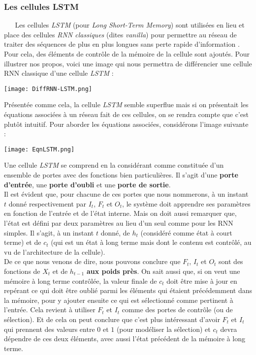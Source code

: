 \subsubsection{Les cellules LSTM}
$ _{} $ $ _{} $ $ _{} $ $ _{} $ $ _{} $Les cellules \textit{LSTM} (pour \textit{Long Short-Term Memory}) sont utilisées en lieu et place des cellules \textit{RNN classiques} (dites \textit{vanilla}) pour permettre au réseau de traiter des séquences de plus en plus longues sans perte rapide d'information \cite{geron2020deep}. Pour cela, des éléments de contrôle de la mémoire de la cellule sont ajoutés. Pour illustrer nos propos, voici une image qui nous permettra de différencier une cellule RNN classique d'une cellule \textit{LSTM} :
\begin{center}
\texttt{[image: DiffRNN-LSTM.png]}
\end{center}
Présentée comme cela, la cellule \textit{LSTM} semble superflue mais si on présentait les équations associées à un réseau fait de ces cellules, on se rendra compte que c'est plutôt intuitif. Pour aborder les équations associées, considérons l'image suivante :\newpage
\begin{center}
\texttt{[image: EqnLSTM.png]}
\end{center}
Une cellule \textit{LSTM} se comprend en la considérant comme constituée d'un ensemble de portes avec des fonctions bien particulières. Il s'agit d'une \textbf{porte d'entrée}, une \textbf{porte d'oubli} et une \textbf{porte de sortie}.\\
Il est évident que, pour chacune de ces portes que nous nommerons, à un instant $ t $ donné respectivement par $ I_{t} $, $ F_{t} $ et $ O_{t} $, le système doit apprendre ses paramètres en fonction de l'entrée et de l'état interne. Mais on doit aussi remarquer que, l'état est défini par deux paramètres au lieu d'un seul comme pour les RNN simples. Il s'agit, à un instant $ t $ donné, de $ h_{t} $ (considéré comme état à court terme) et de $ c_{t} $ (qui est un état à long terme mais dont le contenu est contrôlé, au vu de l'architecture de la cellule).\\
De ce que nous venons de dire, nous pouvons conclure que $ F_{t} $, $ I_{t} $ et $ O_{t} $ sont des fonctions de $ X_{t} $ et de $ h_{t-1} $ \textbf{aux poids près}. On sait aussi que, si on veut une mémoire à long terme contrôlée, la valeur finale de $ c_{t} $ doit être mise à jour en repérant ce qui doit être oublié parmi les éléments qui étaient précédemment dans la mémoire, pour y ajouter ensuite ce qui est sélectionné comme pertinent à l'entrée. Cela revient à utiliser $ F_{t} $ et $ I_{t} $ comme des portes de contrôle (ou de sélection). Et de cela on peut conclure que c'est plus intéressant d'avoir $ F_{t} $ et $ I_{t} $ qui prennent des valeurs entre $ 0 $ et $ 1 $ (pour modéliser la sélection) et $ c_{t} $ devra dépendre de ces deux éléments, avec aussi l'état précédent de la mémoire à long terme.\\
